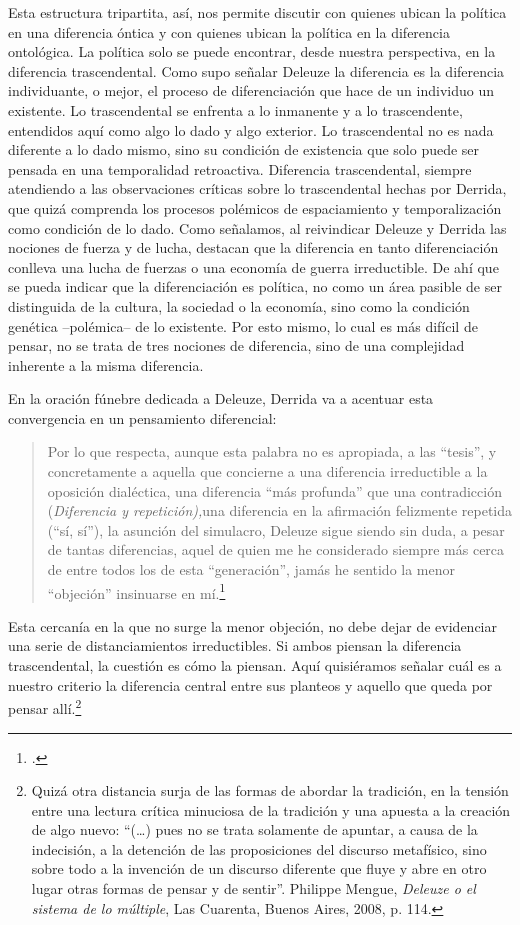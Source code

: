 Esta estructura tripartita, así, nos permite discutir con quienes ubican
la política en una diferencia óntica y con quienes ubican la política en
la diferencia ontológica. La política solo se puede encontrar, desde
nuestra perspectiva, en la diferencia trascendental. Como supo señalar
Deleuze la diferencia es la diferencia individuante, o mejor, el proceso
de diferenciación que hace de un individuo un existente. Lo
trascendental se enfrenta a lo inmanente y a lo trascendente, entendidos
aquí como algo lo dado y algo exterior. Lo trascendental no es nada
diferente a lo dado mismo, sino su condición de existencia que solo
puede ser pensada en una temporalidad retroactiva. Diferencia
trascendental, siempre atendiendo a las observaciones críticas sobre lo
trascendental hechas por Derrida, que quizá comprenda los procesos
polémicos de espaciamiento y temporalización como condición de lo dado.
Como señalamos, al reivindicar Deleuze y Derrida las nociones de fuerza
y de lucha, destacan que la diferencia en tanto diferenciación conlleva
una lucha de fuerzas o una economía de guerra irreductible. De ahí que
se pueda indicar que la diferenciación es política, no como un área
pasible de ser distinguida de la cultura, la sociedad o la economía,
sino como la condición genética --polémica-- de lo existente. Por esto
mismo, lo cual es más difícil de pensar, no se trata de tres nociones de
diferencia, sino de una complejidad inherente a la misma diferencia.

En la oración fúnebre dedicada a Deleuze, Derrida va a acentuar esta
convergencia en un pensamiento diferencial:

\begin{quote}
Por lo que respecta, aunque esta palabra no es apropiada, a las
``tesis'', y concretamente a aquella que concierne a una diferencia
irreductible a la oposición dialéctica, una diferencia ``más profunda''
que una contradicción (\emph{Diferencia y repetición),}una diferencia en
la afirmación felizmente repetida (``sí, sí''), la asunción del
simulacro, Deleuze sigue siendo sin duda, a pesar de tantas diferencias,
aquel de quien me he considerado siempre más cerca de entre todos los de
esta ``generación'', jamás he sentido la menor ``objeción'' insinuarse
en mí.\footcite{derrida2005}
\end{quote}

Esta cercanía en la que no surge la menor objeción, no debe dejar de
evidenciar una serie de distanciamientos irreductibles. Si ambos piensan
la diferencia trascendental, la cuestión es cómo la piensan. Aquí
quisiéramos señalar cuál es a nuestro criterio la diferencia central
entre sus planteos y aquello que queda por pensar allí.\footnote{Quizá
  otra distancia surja de las formas de abordar la tradición, en la
  tensión entre una lectura crítica minuciosa de la tradición y una
  apuesta a la creación de algo nuevo: \enquote{(\dots) pues no se trata
  solamente de apuntar, a causa de la indecisión, a la detención de las
  proposiciones del discurso metafísico, sino sobre todo a la invención
  de un discurso diferente que fluye y abre en otro lugar otras formas
  de pensar y de sentir}. Philippe Mengue, \emph{Deleuze o el sistema de
  lo múltiple}, Las Cuarenta, Buenos Aires, 2008, p. 114.}

